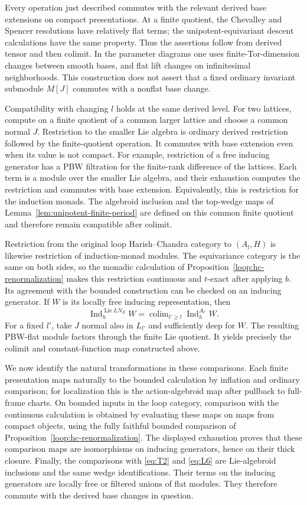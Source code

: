 \documentclass[11pt]{article}
\numberwithin{equation}{section}
\theoremstyle{definition}
\theoremstyle{remark}
\begin{document}
Every operation just described commutes with the relevant derived
base extensions on compact presentations.  At a finite quotient,
the Chevalley and Spencer resolutions have relatively flat terms;
the unipotent-equivariant descent calculations have the same property.
Thus the assertions follow from derived tensor and then colimit.
In the parameter diagrams one uses finite-Tor-dimension changes
between smooth bases, and flat lift changes on infinitesimal
neighborhoods.  This construction does not assert that a fixed
ordinary invariant submodule $M[J]$ commutes with a nonflat base
change.

Compatibility with changing $l$ holds at the same derived level.
For two lattices, compute on a finite quotient of a common larger
lattice and choose a common normal $J$.  Restriction to the smaller
Lie algebra is ordinary derived restriction followed by the
finite-quotient operation.  It commutes with base extension even
when its value is not compact.  For example, restriction of a free
inducing generator has a PBW filtration for the finite-rank difference
of the lattices.  Each term is a module over the smaller Lie algebra,
and their exhaustion computes the restriction and commutes with
base extension.  Equivalently, this is restriction for the induction
monads.  The algebroid inclusion and the top-wedge maps of
Lemma~\ref{lem:unipotent-finite-period} are defined on this common
finite quotient and therefore remain compatible after colimit.

Restriction from the original loop Harish--Chandra category to
$(A_l,H)$ is likewise restriction of induction-monad modules.  The
equivariance category is the same on both sides, so the monadic
calculation of Proposition~\ref{loop:hc-renormalization} makes this
restriction continuous and $t$-exact after applying $b$.  Its agreement with the bounded construction can be checked
on an inducing generator.  If $W$ is its locally free inducing
representation, then
\[
 \operatorname{Ind}_{h}^{\operatorname{Lie}LN_E}W
   =\mathop{\operatorname{colim}}_{l'\geq l}
                         \operatorname{Ind}_{h}^{A_{l'}}W.
\]
For a fixed $l'$, take $J$ normal also in $L_{l'}$ and sufficiently
deep for $W$.  The resulting PBW-flat module factors through the
finite Lie quotient.  It yields precisely the colimit and
constant-function map constructed above.

We now identify the natural transformations in these comparisons.
Each finite presentation maps naturally to the bounded
calculation by inflation and ordinary comparison; for localization
this is the action-algebroid map after pullback to full-frame charts.
On bounded inputs in the loop category, comparison with the
continuous calculation is obtained by evaluating these maps on
maps from compact objects, using the fully faithful bounded
comparison of
Proposition~\ref{loop:hc-renormalization}.  The displayed exhaustion proves that
these comparison maps are isomorphisms on inducing generators,
hence on their thick closure.  Finally, the comparisons with
\eqref{eq:T2} and \eqref{eq:L6} are Lie-algebroid inclusions and
the same wedge identifications.  Their terms on the inducing
generators are locally free or filtered unions of flat modules.
They therefore commute with the derived base changes in question.
\end{document}

